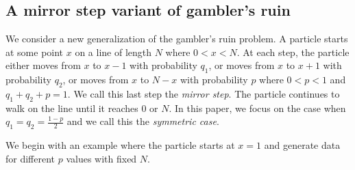 \documentclass[reqno]{amsart}
\theoremstyle{definition}
\theoremstyle{definition}
\theoremstyle{remark}
\begin{document}
\subsection{A mirror step variant of gambler's ruin}\label{subsec:mirror}
We consider a new generalization of the gambler's ruin problem. A particle starts at some point $x$ on a line of length $N$ where $0< x <N$. At each step, the particle either moves from $x$ to $x-1$ with probability $q_1$, or moves from $x$ to $x+1$ with probability $q_2$, or moves from $x$ to $N-x$ with probability $p$ where $0<p<1$ and $q_1+q_2+p=1$. We call this last step the \textit{mirror step}. The particle continues to walk on the line until it reaches $0$ or $N$. In this paper, we focus on the case when $q_1=q_2=\frac{1-p}{2}$ and we call this the \textit{symmetric case}. 


We begin with an example where the particle starts at $x=1$ and generate data for different $p$ values with fixed $N$. 
\end{document}
